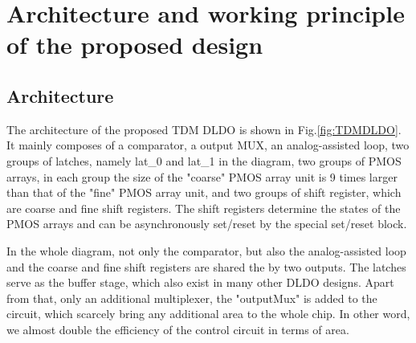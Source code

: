 \documentclass[draftcls, journal]{IEEEtran}
\begin{document}
\section{Architecture and working principle of the proposed design}
\subsection{Architecture}
The architecture of the proposed TDM DLDO is shown in Fig.\ref{fig:TDMDLDO}. It mainly composes of a comparator, a output MUX, an analog-assisted loop, two groups of latches, namely lat\_0 and lat\_1 in the diagram, two groups of PMOS arrays, in each group the size of the "coarse" PMOS array unit is 9 times larger than that of the "fine" PMOS array unit, and two groups of shift register, which are coarse and fine shift registers. The shift registers determine the states of the PMOS arrays and can be asynchronously set/reset by the special set/reset block.  

In the whole diagram, not only the comparator, but also the analog-assisted loop and the coarse and fine shift registers are shared the by two outputs. The latches serve as the buffer stage, which also exist in many other DLDO designs\cite{AALDO,AALDO1}. Apart from that, only an additional multiplexer, the "outputMux" is added to the circuit, which scarcely bring any additional area to the whole chip. In other word, we almost double the efficiency of the control circuit in terms of area.
\end{document}

